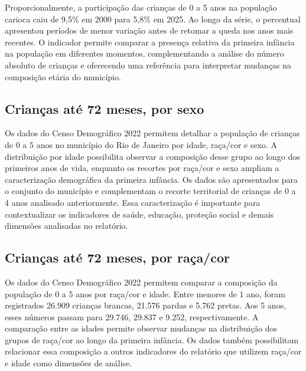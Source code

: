 Proporcionalmente, a participação das crianças de 0 a 5 anos na população carioca caiu de 9,5\% em 2000 para 5,8\% em 2025. Ao longo da série, o percentual apresentou períodos de menor variação antes de retomar a queda nos anos mais recentes. O indicador permite comparar a presença relativa da primeira infância na população em diferentes momentos, complementando a análise do número absoluto de crianças e oferecendo uma referência para interpretar mudanças na composição etária do município.


\subsection{Crianças até 72 meses, por sexo}


Os dados do Censo Demográfico 2022 permitem detalhar a população de crianças de 0 a 5 anos no município do Rio de Janeiro por idade, raça/cor e sexo. A distribuição por idade possibilita observar a composição desse grupo ao longo dos primeiros anos de vida, enquanto os recortes por raça/cor e sexo ampliam a caracterização demográfica da primeira infância. Os dados são apresentados para o conjunto do município e complementam o recorte territorial de crianças de 0 a 4 anos analisado anteriormente. Essa caracterização é importante para contextualizar os indicadores de saúde, educação, proteção social e demais dimensões analisadas no relatório.


\subsection{Crianças até 72 meses, por raça/\allowbreak{}cor}


Os dados do Censo Demográfico 2022 permitem comparar a composição da população de 0 a 5 anos por raça/cor e idade. Entre menores de 1 ano, foram registrados 26.909 crianças brancas, 21.576 pardas e 5.762 pretas. Aos 5 anos, esses números passam para 29.746, 29.837 e 9.252, respectivamente. A comparação entre as idades permite observar mudanças na distribuição dos grupos de raça/cor ao longo da primeira infância. Os dados também possibilitam relacionar essa composição a outros indicadores do relatório que utilizem raça/cor e idade como dimensões de análise.

